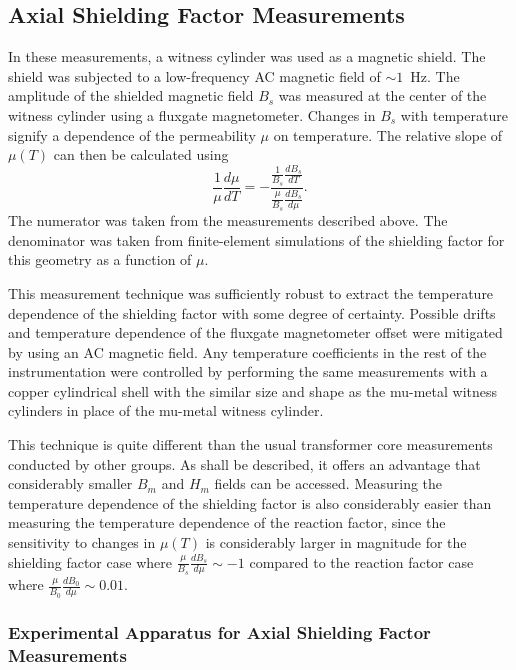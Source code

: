 
\subsection{Axial Shielding Factor Measurements\label{sec:axial}}

In these measurements, a witness cylinder was used as a magnetic
shield.  The shield was subjected to a low-frequency AC magnetic field
of $\sim 1$~Hz.  The amplitude of the shielded magnetic field $B_s$
was measured at the center of the witness cylinder using a fluxgate
magnetometer.  Changes in $B_s$ with temperature signify a dependence
of the permeability $\mu$ on temperature.  The relative slope of
$\mu(T)$ can then be calculated using
\begin{equation}
\frac{1}{\mu}\frac{d\mu}{dT}=-\frac{\frac{1}{B_s}\frac{dB_s}{dT}}{\frac{\mu}{B_s}\frac{dB_s}{d\mu}}.
\label{eqn:axial}
\end{equation}
The numerator was taken from the measurements described above. The
denominator was taken from finite-element simulations of the shielding
factor for this geometry as a function of $\mu$.

This measurement technique was sufficiently robust to extract the
temperature dependence of the shielding factor with some degree of
certainty. Possible drifts and temperature dependence of the fluxgate
magnetometer offset were mitigated by using an AC magnetic field.  Any
temperature coefficients in the rest of the instrumentation were
controlled by performing the same measurements with a copper
cylindrical shell with the similar size and shape as the mu-metal
witness cylinders in place of the mu-metal witness cylinder.

This technique is quite different than the usual transformer core
measurements conducted by other groups.  As shall be described, it
offers an advantage that considerably smaller $B_m$ and $H_m$ fields
can be accessed.  Measuring the temperature dependence of the
shielding factor is also considerably easier than measuring the
temperature dependence of the reaction factor, since the sensitivity
to changes in $\mu(T)$ is considerably larger in magnitude for the
shielding factor case where $\frac{\mu}{B_s}\frac{dB_s}{d\mu}\sim -1$
compared to the reaction factor case where
$\frac{\mu}{B_0}\frac{dB_0}{d\mu}\sim 0.01$.


\subsubsection{Experimental Apparatus for Axial Shielding Factor
  Measurements}

